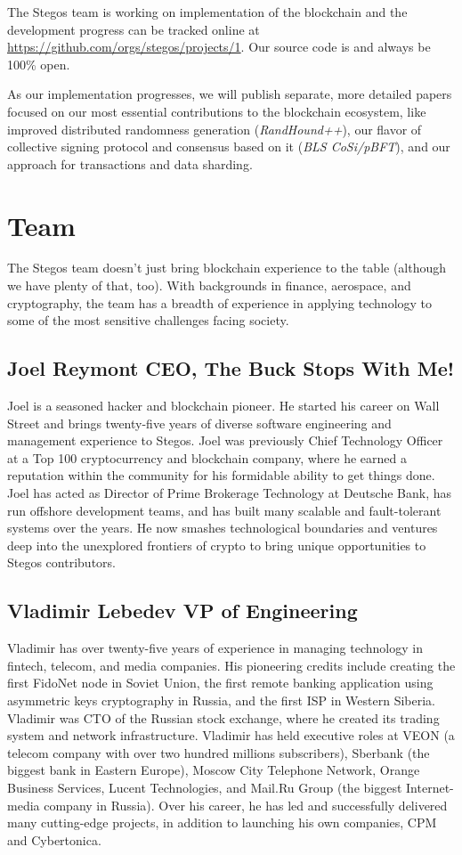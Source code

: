 \documentclass[8pt,fleqn,openany]{book}
\begin{document}
The Stegos team is working on implementation of the blockchain and the development progress can be tracked online at \url{https://github.com/orgs/stegos/projects/1}. Our source code is and always be 100\% open.

As our implementation progresses, we will publish separate, more detailed papers focused on our most essential contributions to the blockchain ecosystem, like improved distributed randomness generation (\textit{RandHound++}), our flavor of collective signing protocol and consensus based on it (\textit{BLS CoSi/pBFT}), and our approach for transactions and data sharding. 

\chapter{Team}\label{app:team}

The Stegos team doesn't just bring blockchain experience to the table (although we have plenty of that, too). With backgrounds in finance, aerospace, and cryptography, the team has a breadth of experience in applying technology to some of the most sensitive challenges facing society.

\section{Joel Reymont CEO, The Buck Stops With Me!}
Joel is a seasoned hacker and blockchain pioneer. He started his career on Wall Street and brings twenty-five years of diverse software engineering and management experience to Stegos. Joel was previously Chief Technology Officer at a Top 100 cryptocurrency and blockchain company, where he earned a reputation within the community for his formidable ability to get things done. Joel has acted as Director of Prime Brokerage Technology at Deutsche Bank, has run offshore development teams, and has built many scalable and fault-tolerant systems over the years. He now smashes technological boundaries and ventures deep into the unexplored frontiers of crypto to bring unique opportunities to Stegos contributors. 

\section{Vladimir Lebedev VP of Engineering}
Vladimir has over twenty-five years of experience in managing technology in fintech, telecom, and media companies. His pioneering credits include creating the first FidoNet node in Soviet Union, the first remote banking application using asymmetric keys cryptography in Russia, and the first ISP in Western Siberia. Vladimir was CTO of the Russian stock exchange, where he created its trading system and network infrastructure. Vladimir has held executive roles at VEON (a telecom company with over two hundred millions subscribers), Sberbank (the biggest bank in Eastern Europe), Moscow City Telephone Network, Orange Business Services, Lucent Technologies, and Mail.Ru Group (the biggest Internet-media company in Russia). Over his career, he has led and successfully delivered many cutting-edge projects, in addition to launching his own companies, CPM and Cybertonica. 
\end{document}
